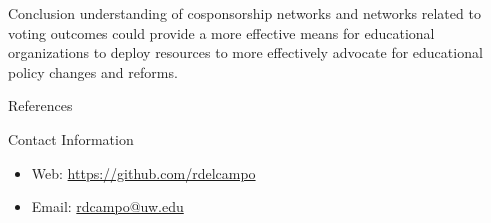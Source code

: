 \documentclass[final]{beamer}
\newlength{\onecolwid}
\begin{document}
\begin{frame}[t]
\begin{columns}[t]
\begin{column}{\onecolwid}
\begin{block}{Conclusion}
					understanding of cosponsorship networks and networks related to voting outcomes could provide a more effective means 
					for educational organizations to deploy resources to more effectively advocate for educational policy changes and reforms.
				\end{block}
				\begin{block}{References}
					\nocite{*}  %
					\small{\printbibliography}
				\end{block}
				\begin{alertblock}{Contact Information}
					\begin{itemize}
						\item Web: \href{https://github.com/rdelcampo}{https://github.com/rdelcampo}
						\item Email: \href{mailto:roxanadelcampo@gmail.com}{rdcampo@uw.edu}
					\end{itemize}
				\end{alertblock}
			\end{column} %
		\end{columns} %
	\end{frame} %
\end{document}
